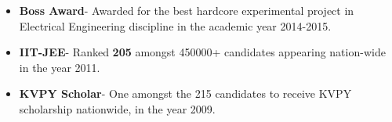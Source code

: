 \documentclass[10pt,a4paper,ragged2e,withhyper]{altacv}
\begin{document}
\begin{itemize}
  \item \textbf{Boss Award}- Awarded for the best hardcore experimental project in Electrical Engineering discipline in the
  academic year 2014-2015.
  \item \textbf{IIT-JEE}- Ranked \textbf{205} amongst 450000+ candidates appearing nation-wide in the year 2011.
  \item \textbf{KVPY Scholar}- One amongst the 215 candidates to receive KVPY scholarship nationwide, in the year 2009.
\end{itemize}



\nocite{*}

\printbibliography[heading=pubtype,title={\printinfo{\faFile*[regular]}{Papers}}, type=article]

\divider

\printbibliography[heading=pubtype,title={\printinfo{\faCopyright}{Patents and Applications}},type=misc]
\end{document}
